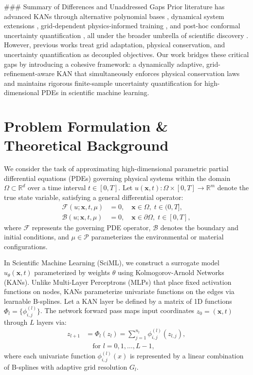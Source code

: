 \documentclass[10pt,twocolumn]{article}
\begin{document}
### Summary of Differences and Unaddressed Gaps
Prior literature has advanced KANs through alternative polynomial bases \cite{ref_5}, dynamical system extensions \cite{ref_4}, grid-dependent physics-informed training \cite{ref_3}, and post-hoc conformal uncertainty quantification \cite{ref_1}, all under the broader umbrella of scientific discovery \cite{target_ref}. However, previous works treat grid adaptation, physical conservation, and uncertainty quantification as decoupled objectives. Our work bridges these critical gaps by introducing a cohesive framework: a dynamically adaptive, grid-refinement-aware KAN that simultaneously enforces physical conservation laws and maintains rigorous finite-sample uncertainty quantification for high-dimensional PDEs in scientific machine learning.

\section{Problem Formulation \& Theoretical Background}
We consider the task of approximating high-dimensional parametric partial differential equations (PDEs) governing physical systems within the domain $\Omega \subset \mathbb{R}^d$ over a time interval $t \in [0, T]$. Let $u(\mathbf{x}, t): \Omega \times [0, T] \to \mathbb{R}^m$ denote the true state variable, satisfying a general differential operator:
\begin{equation}
\begin{aligned}
\mathcal{F}(u; \mathbf{x}, t, \mu) &= 0, \quad \mathbf{x} \in \Omega, \; t \in (0, T], \\
\mathcal{B}(u; \mathbf{x}, t, \mu) &= 0, \quad \mathbf{x} \in \partial\Omega, \; t \in [0, T],
\end{aligned}
\end{equation}
where $\mathcal{F}$ represents the governing PDE operator, $\mathcal{B}$ denotes the boundary and initial conditions, and $\mu \in \mathcal{P}$ parameterizes the environmental or material configurations.

In Scientific Machine Learning (SciML), we construct a surrogate model $\hat{u}_{\theta}(\mathbf{x}, t)$ parameterized by weights $\theta$ using Kolmogorov-Arnold Networks (KANs). Unlike Multi-Layer Perceptrons (MLPs) that place fixed activation functions on nodes, KANs parameterize univariate functions on the edges via learnable B-splines. Let a KAN layer be defined by a matrix of 1D functions $\Phi_l = \{\phi_{i,j}^{(l)}\}$. The network forward pass maps input coordinates $z_0 = (\mathbf{x}, t)$ through $L$ layers via:
\begin{equation}
\begin{aligned}
z_{l+1} &= \Phi_l(z_l) = \sum_{j=1}^{n_l} \phi_{i,j}^{(l)}(z_{l,j}), \\
&\quad \text{for } l = 0, 1, \dots, L-1,
\end{aligned}
\end{equation}
where each univariate function $\phi_{i,j}^{(l)}(x)$ is represented by a linear combination of B-splines with adaptive grid resolution $G_l$. 
\end{document}
